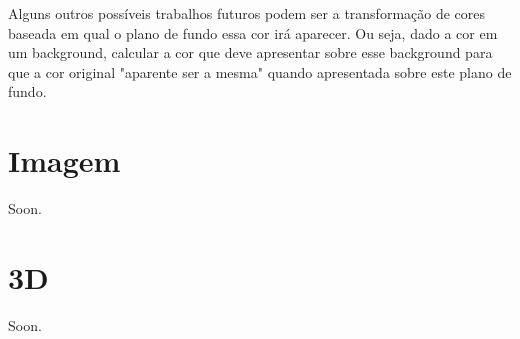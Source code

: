 \documentclass[a4paper,10pt]{report}
\begin{document}
\par
Alguns outros possíveis trabalhos futuros podem ser a transformação de cores
baseada em qual o plano de fundo essa cor irá aparecer. Ou seja, dado a cor em
um background, calcular a cor que deve apresentar sobre esse background
para que a cor original "aparente ser a mesma" quando apresentada sobre este
plano de fundo.

\chapter{Imagem}
Soon.

\chapter{3D}
Soon.
\end{document}
